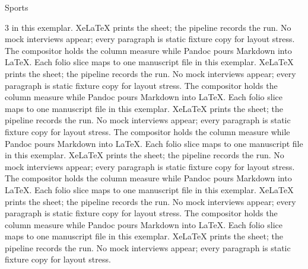 \documentclass[
  ignorenonframetext,
]{beamer}
\begin{document}
\begin{frame}{Sports}
\begin{multicols}{3}
in this exemplar. XeLaTeX prints the sheet; the pipeline records the
run. No mock interviews appear; every paragraph is static fixture copy
for layout stress. The compositor holds the column measure while Pandoc
pours Markdown into LaTeX. Each folio slice maps to one manuscript file
in this exemplar. XeLaTeX prints the sheet; the pipeline records the
run. No mock interviews appear; every paragraph is static fixture copy
for layout stress. The compositor holds the column measure while Pandoc
pours Markdown into LaTeX. Each folio slice maps to one manuscript file
in this exemplar. XeLaTeX prints the sheet; the pipeline records the
run. No mock interviews appear; every paragraph is static fixture copy
for layout stress. The compositor holds the column measure while Pandoc
pours Markdown into LaTeX. Each folio slice maps to one manuscript file
in this exemplar. XeLaTeX prints the sheet; the pipeline records the
run. No mock interviews appear; every paragraph is static fixture copy
for layout stress. The compositor holds the column measure while Pandoc
pours Markdown into LaTeX. Each folio slice maps to one manuscript file
in this exemplar. XeLaTeX prints the sheet; the pipeline records the
run. No mock interviews appear; every paragraph is static fixture copy
for layout stress. The compositor holds the column measure while Pandoc
pours Markdown into LaTeX. Each folio slice maps to one manuscript file
in this exemplar. XeLaTeX prints the sheet; the pipeline records the
run. No mock interviews appear; every paragraph is static fixture copy
for layout stress.

\end{multicols}
\end{frame}
\end{document}
